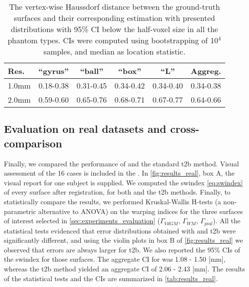 \begin{table}
		\centering
		\footnotesize
    \tabcolsep=0.1cm
    \begin{tabular}{lccccc}
    Res.   & ``gyrus'' & ``ball''  & ``box''   & ``L''     & Aggreg.    \\\hline
    1.0mm  & 0.18-0.38 & 0.31-0.45 & 0.34-0.42 & 0.34-0.40 & 0.34-0.38  \\
    2.0mm  & 0.59-0.60 & 0.65-0.76 & 0.68-0.71 & 0.67-0.77 & 0.64-0.66  \\
    \hline
    \end{tabular}
    \caption{The vertex-wise Haussdorf distance between the ground-truth surfaces and their
    corresponding estimation with \regseg{} presented distributions with 95\% CI below
    the half-voxel size in all the phantom types.
    CIs were computed using bootstrapping of 10$^4$ samples, and median as location statistic.}\label{tab:ci_phantom}
\end{table}

\subsection{Evaluation on real datasets and cross-comparison}\label{sec:results_hcp}
%
Finally, we compared the performance of \regseg{} and the standard \gls*{t2b}
  method.
Visual assessment of the 16 cases is included in the .
In \autoref{fig:results_real}, box A, the visual report for one subject is supplied.
We computed the \gls*{swindex} \eqref{eq:swindex} of every surface after registration,
  for both \regseg{} and the \gls*{t2b} methods.
Finally, to statistically compare the results, we performed Kruskal-Wallis H-tests
  (a non-parametric alternative to ANOVA) on the warping indices for the three surfaces of 
  interest selected in \autoref{sec:experiments_evaluation}
  ($\Gamma_{VdGM}$, $\Gamma_{WM}$, $\Gamma_{pial}$).
All the statistical tests evidenced that error distributions obtained with \regseg{} and
  \gls*{t2b} were significantly different, and using the violin plots in box B of
  \autoref{fig:results_real} we observed that errors are always larger for \gls*{t2b}.
We also reported the 95\% CIs of the \gls*{swindex} for those surfaces.
The aggregate CI for \regseg{} was 1.08 - 1.50 [mm], whereas the \gls*{t2b} method
  yielded an aggregate CI of 2.06 - 2.43 [mm].
The results of the statistical tests and the CIs are summarized in \autoref{tab:results_real}.



